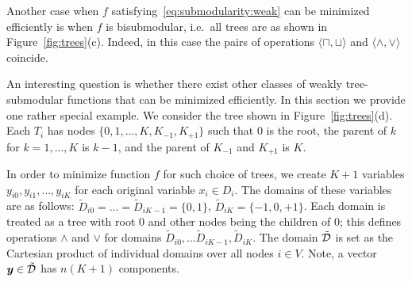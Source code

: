 \documentclass[11pt,onecolumn]{article}
\def\D{{\cal D}}
\newcommand{\by}{\mbox{\boldmath $y$}}
\begin{document}
Another case when $f$ satisfying~\eqref{eq:submodularity:weak} can be minimized efficiently is when $f$ is bisubmodular, i.e.\ all trees
are as shown in Figure~\ref{fig:trees}(c). Indeed, in this case the pairs of operations $\langle\sqcap,\sqcup\rangle$ and $\langle\wedge,\vee\rangle$ coincide.

An interesting question is whether there exist other classes of weakly tree-submodular functions that
can be minimized efficiently. In this section we provide one rather special example. We consider the tree shown in
Figure~\ref{fig:trees}(d). Each $T_i$ has nodes $\{0,1,\ldots,K,K_{-1},K_{+1}\}$ such that $0$ is the root, the parent of
$k$ for $k=1,\ldots,K$ is $k-1$, and the parent of $K_{-1}$ and $K_{+1}$ is $K$. 

In order to minimize function $f$ for such choice of trees, we create $K+1$ variables $y_{i0},y_{i1},\ldots,y_{iK}$ for
each original variable $x_i\in D_i$. The domains of these variables are as follows:
$\tilde D_{i0}=\ldots=\tilde D_{iK-1}=\{0,1\}$, $\tilde D_{iK}=\{-1,0,+1\}$. Each domain 
is treated as a tree with root $0$ and other nodes being the children of $0$; this defines operations $\wedge$ and $\vee$
for domains $\tilde D_{i0},\ldots \tilde D_{iK-1}, \tilde D_{iK}$. The domain $\tilde \D$ is set as the Cartesian product of individual
domains over all nodes $i\in V$. Note, a vector $\by\in \tilde \D$ has $n(K+1)$ components.
\end{document}
